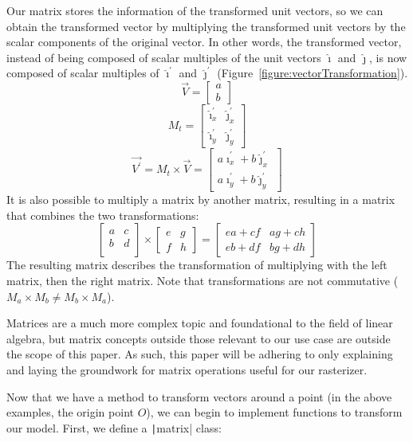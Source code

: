 \documentclass[a4paper]{article}
\newcommand*{\ihat}{\hat{\imath}}
\newcommand*{\jhat}{\hat{\jmath}}
\begin{document}
Our matrix stores the information of the transformed unit vectors, so we can obtain the transformed vector by multiplying the transformed unit vectors by the scalar components of the original vector. In other words, the transformed vector, instead of being composed of scalar multiples of the unit vectors $\ihat$ and $\jhat$, is now composed of scalar multiples of $\ihat^\prime$ and $\jhat^\prime$ (Figure~\ref{figure:vectorTransformation}).
\[
\vec{V} =
\begin{bmatrix}
    a \\
    b
\end{bmatrix}
\]
\[
M_t = 
\begin{bmatrix}
    \ihat^\prime_x & \jhat^\prime_x\\
    \ihat^\prime_y & \jhat^\prime_y
\end{bmatrix}
\]
\[
\vec{V^\prime} = M_t \times \vec{V} =
\begin{bmatrix}
    a\ihat^\prime_x + b\jhat^\prime_x \\
    a\ihat^\prime_y + b\jhat^\prime_y
\end{bmatrix}
\]
It is also possible to multiply a matrix by another matrix, resulting in a matrix that combines the two transformations:
\[
\begin{bmatrix}
    a & c \\
    b & d \\
\end{bmatrix}
\times
\begin{bmatrix}
    e & g \\
    f & h
\end{bmatrix}
=
\begin{bmatrix}
    ea + cf & ag + ch \\
    eb + df & bg + dh
\end{bmatrix}
\]
The resulting matrix describes the transformation of multiplying with the left matrix, then the right matrix. Note that transformations are not commutative ($M_a \times M_b \neq M_b \times M_a$).

Matrices are a much more complex topic and foundational to the field of linear algebra, but matrix concepts outside those relevant to our use case are outside the scope of this paper. As such, this paper will be adhering to only explaining and laying the groundwork for matrix operations useful for our rasterizer.

Now that we have a method to transform vectors around a point (in the above examples, the origin point $O$), we can begin to implement functions to transform our model. First, we define a \texttt|matrix| class:
\end{document}
